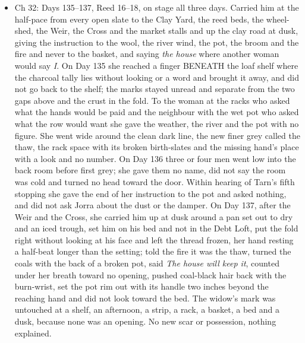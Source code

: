 \documentclass{design/chronicle}
\begin{document}
{\begin{itemize}[leftmargin=1.4em,itemsep=1pt,topsep=3pt,parsep=0pt]
\end{itemize}

\begin{itemize}[leftmargin=1.4em,itemsep=1pt,topsep=3pt,parsep=0pt]

\item Ch 32: Days 135–137, Reed 16–18, on stage all three days. Carried him at the half-pace from every open slate to the Clay Yard, the reed beds, the wheel-shed, the Weir, the Cross and the market stalls and up the clay road at dusk, giving the instruction to the wool, the river wind, the pot, the broom and the fire and never to the basket, and saying \emph{the house} where another woman would say \emph{I}. On Day 135 she reached a finger BENEATH the loaf shelf where the charcoal tally lies without looking or a word and brought it away, and did not go back to the shelf; the marks stayed unread and separate from the two gaps above and the crust in the fold. To the woman at the racks who asked what the hands would be paid and the neighbour with the wet pot who asked what the row would want she gave the weather, the river and the pot with no figure. She went wide around the clean dark line, the new finer grey called the thaw, the rack space with its broken birth-slates and the missing hand’s place with a look and no number. On Day 136 three or four men went low into the back room before first grey; she gave them no name, did not say the room was cold and turned no head toward the door. Within hearing of Tarn’s fifth stopping she gave the end of her instruction to the pot and asked nothing, and did not ask Jorra about the dust or the damper. On Day 137, after the Weir and the Cross, she carried him up at dusk around a pan set out to dry and an iced trough, set him on his bed and not in the Debt Loft, put the fold right without looking at his face and left the thread frozen, her hand resting a half-beat longer than the setting; told the fire it was the thaw, turned the coals with the back of a broken pot, said \emph{The house will keep it}, counted under her breath toward no opening, pushed coal-black hair back with the burn-wrist, set the pot rim out with its handle two inches beyond the reaching hand and did not look toward the bed. The widow’s mark was untouched at a shelf, an afternoon, a strip, a rack, a basket, a bed and a dusk, because none was an opening. No new scar or possession, nothing explained.

\end{itemize}

\begin{itemize}[leftmargin=1.4em,itemsep=1pt,topsep=3pt,parsep=0pt]


\end{itemize}}
\end{document}

